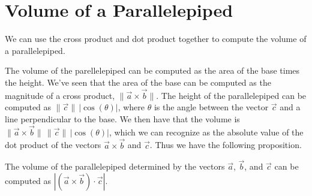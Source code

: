 \documentclass{ximera}
\begin{document}
\section*{Volume of a Parallelepiped}

We can use the cross product and dot product together to compute the volume of a parallelepiped.

\begin{image}
\end{image}

The volume of the parellelepiped can be computed as the area of the base times the height. We've seen that the area of the base can be computed as the magnitude of a cross product, $\|\vec{a}\times\vec{b}\|$. The height of the parallelepiped can be computed as $\|\vec{c}\|\,|\cos(\theta)|$, where $\theta$ is the angle between the vector $\vec{c}$ and a line perpendicular to the base. We then have that the volume is $\|\vec{a}\times\vec{b}\|\,\|\vec{c}\|\,|\cos(\theta)|$, which we can recognize as the absolute value of the dot product of the vectors $\vec{a}\times\vec{b}$ and $\vec{c}$. Thus we have the following proposition.

\begin{proposition}
The volume of the parallelepiped determined by the vectors $\vec{a}$, $\vec{b}$, and $\vec{c}$ can be computed as $|(\vec{a}\times\vec{b})\cdot\vec{c}|$.
\end{proposition}
\end{document}
